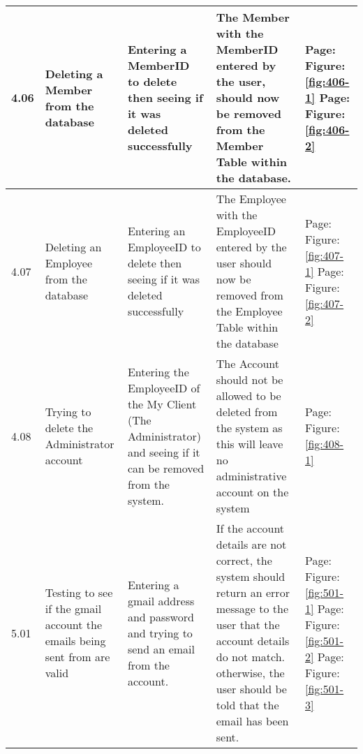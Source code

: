 \begin{flushleft}
\begin{longtable}{|p{1cm}|p{2.5cm}|p{2.5cm}|p{2cm}|p{2cm}|}
	4.06 & Deleting a Member from the database &  Entering a MemberID to delete then seeing if it was deleted successfully & The Member with the MemberID entered by the user, should now be removed from the Member Table within the database. &  Page:\pageref{fig:406-1}  \newline Figure:\ref{fig:406-1} \newline \newline  Page:\pageref{fig:406-2}  \newline Figure:\ref{fig:406-2}\\ \hline
	4.07 & Deleting an Employee from the database &  Entering an EmployeeID to delete then seeing if it was deleted successfully & The Employee with the EmployeeID entered by the user should now be removed from the Employee Table within the database & Page:\pageref{fig:407-1}  \newline Figure:\ref{fig:407-1} \newline \newline  Page:\pageref{fig:407-2}  \newline Figure:\ref{fig:407-2} \\ \hline
	4.08 & Trying to delete the Administrator account  & Entering the EmployeeID of the My Client (The Administrator) and seeing if it can be removed from the system. & The Account should not be allowed to be deleted from the system as this will leave no administrative account on the system & Page:\pageref{fig:408-1}  \newline Figure:\ref{fig:408-1}\\ \hline
	\rowcolor{light-grey} 5.01 & Testing to see if the gmail account the emails being sent from are valid & Entering a gmail address and password and trying to send an email from the account. &If the account details are not correct, the system should return an error message to the user that the account details do not match. otherwise, the user should be told that the email has been sent. & Page:\pageref{fig:501-1}  \newline Figure:\ref{fig:501-1} \newline \newline  Page:\pageref{fig:501-2}  \newline Figure:\ref{fig:501-2}  \newline \newline  Page:\pageref{fig:501-3}  \newline Figure:\ref{fig:501-3}\\ \hline

\end{longtable}
\end{flushleft}
